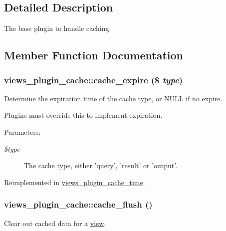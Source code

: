 \subsection{Detailed Description}
The base plugin to handle caching. 

\subsection{Member Function Documentation}
\hypertarget{classviews__plugin__cache_babefa702965b1e9123a9cdc620f7d52}{
\subsubsection[{cache\_\-expire}]{\setlength{\rightskip}{0pt plus 5cm}views\_\-plugin\_\-cache::cache\_\-expire (\$ {\em type})}}
\label{classviews__plugin__cache_babefa702965b1e9123a9cdc620f7d52}


Determine the expiration time of the cache type, or NULL if no expire.

Plugins must override this to implement expiration.

\begin{Desc}
\item[Parameters:]
\begin{description}
\item[{\em \$type}]The cache type, either 'query', 'result' or 'output'. \end{description}
\end{Desc}


Reimplemented in \hyperlink{classviews__plugin__cache__time_6e04720a6807812cfb5840ea7b49baaa}{views\_\-plugin\_\-cache\_\-time}.\hypertarget{classviews__plugin__cache_412bdc7ee43c6c26903d22b636ea96c8}{
\subsubsection[{cache\_\-flush}]{\setlength{\rightskip}{0pt plus 5cm}views\_\-plugin\_\-cache::cache\_\-flush ()}}
\label{classviews__plugin__cache_412bdc7ee43c6c26903d22b636ea96c8}


Clear out cached data for a \hyperlink{classview}{view}.

